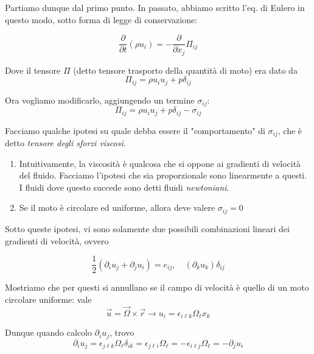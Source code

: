 \documentclass{report}
\begin{document}
Partiamo dunque dal primo punto. In passato, abbiamo scritto l'eq. di Eulero in questo modo, sotto forma di legge di conservazione: 

\begin{equation}
    \frac{\partial}{\partial t}(\rho u_i) = -\frac{\partial}{\partial x_j}\Pi_{ij}
\end{equation}

Dove il tensore $\Pi$ (detto tensore trasporto della quantità di moto) era dato da 
\begin{equation}
    \Pi_{ij} = \rho u_iu_j + p \delta_{ij}
\end{equation}

Ora vogliamo modificarlo, aggiungendo un termine $\sigma_{ij}$: 
\begin{equation}
    \Pi_{ij} = \rho u_iu_j + p \delta_{ij} - \sigma_{ij}
\end{equation}

Facciamo qualche ipotesi su quale debba essere il "comportamento" di $\sigma_{ij}$, che è detto \emph{tensore degli sforzi viscosi}. 

\begin{enumerate}
    \item Intuitivamente, la viscosità è qualcosa che si oppone ai gradienti di  velocità del fluido. Facciamo l'ipotesi che sia proporzionale sono linearmente a questi. I fluidi dove questo succede sono detti fluidi \emph{newtoniani}. 
    \item Se il moto è circolare ed uniforme, allora deve valere $\sigma_{ij}=0$
\end{enumerate}

Sotto queste ipotesi, vi sono solamente due possibili combinazioni lineari dei gradienti di velocità, ovvero 

\begin{equation}
    \frac{1}{2}(\partial_i u_j + \partial_j u_i) = e_{ij}, \quad (\partial_k u_k)\delta_{ij}
\end{equation}

Mostriamo che per questi si annullano se il campo di velocità è quello di un moto circolare uniforme: vale 
\begin{equation}
    \vec{u} = \vec{\Omega} \times \vec{r} \rightarrow u_i = \epsilon_{i\ell k}\Omega_\ell x_k 
\end{equation}

Dunque quando calcolo $\partial _i u_j$, trovo 
\begin{equation}
    \partial _i u_j = \epsilon_{j\ell k}\Omega_\ell \delta_{ik} = \epsilon_{j\ell i}\Omega_\ell = - \epsilon_{i\ell j}\Omega_\ell = - \partial_j u_i
\end{equation}
\end{document}
